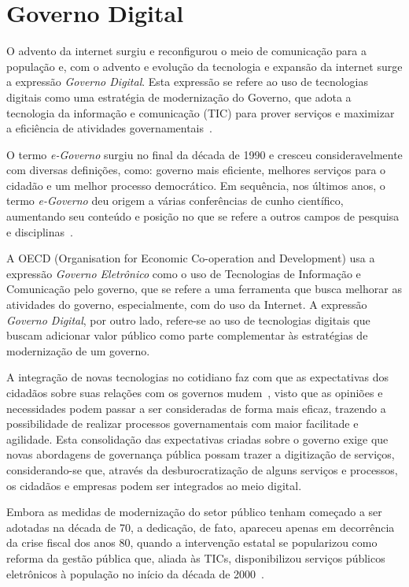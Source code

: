 \section{Governo Digital}

O advento da internet surgiu e reconfigurou o meio de comunicação para a população e, com o advento e evolução da tecnologia 
e expansão da internet surge a expressão \textit{Governo Digital}. Esta expressão se refere ao uso de tecnologias digitais como uma 
estratégia de modernização do Governo, que adota a tecnologia da informação e comunicação (TIC) para prover 
serviços e maximizar a eficiência de atividades governamentais~\cite{fang2002government}. 

O termo \textit{e-Governo} surgiu no final da década de 1990 e cresceu consideravelmente com 
diversas definições, como: governo mais eficiente, melhores serviços para o cidadão e um melhor processo 
democrático. Em sequência, nos últimos anos, o termo \textit{e-Governo} deu origem a várias conferências de cunho científico, aumentando seu 
conteúdo e posição no que se refere a outros campos de pesquisa e disciplinas~\cite{gronlund2005introducing}.

A OECD (Organisation for Economic Co-operation and Development) usa a expressão \textit {Governo Eletrônico} como o uso de 
Tecnologias de Informação e Comunicação pelo governo, que se refere a uma ferramenta que busca melhorar as atividades do governo, 
especialmente, com do uso da Internet. A expressão \textit{Governo Digital}, por outro lado, refere-se ao uso de tecnologias 
digitais que buscam adicionar valor público como parte complementar às estratégias de modernização de um governo.

A integração de novas tecnologias no cotidiano faz com que as expectativas dos cidadãos sobre suas relações com os governos mudem~\cite{oecd}, visto que as opiniões e necessidades podem passar a ser consideradas de forma mais eficaz, trazendo a possibilidade 
de realizar processos governamentais com maior facilitade e agilidade. Esta consolidação das expectativas criadas sobre o governo exige que novas abordagens de governança pública possam trazer a digitização de serviços,
considerando-se que, através da desburocratização de alguns serviços e processos, os cidadãos e empresas podem ser integrados ao meio digital.

Embora as medidas de modernização do setor público tenham começado a ser adotadas na década de 70, a dedicação, de fato, apareceu apenas em decorrência da crise fiscal dos anos 80, quando a intervenção estatal se popularizou como reforma da gestão pública que, aliada às TICs, disponibilizou serviços públicos eletrônicos à população no início da década de 2000~\cite{przeybilovicz2015desenvolvimento}.

